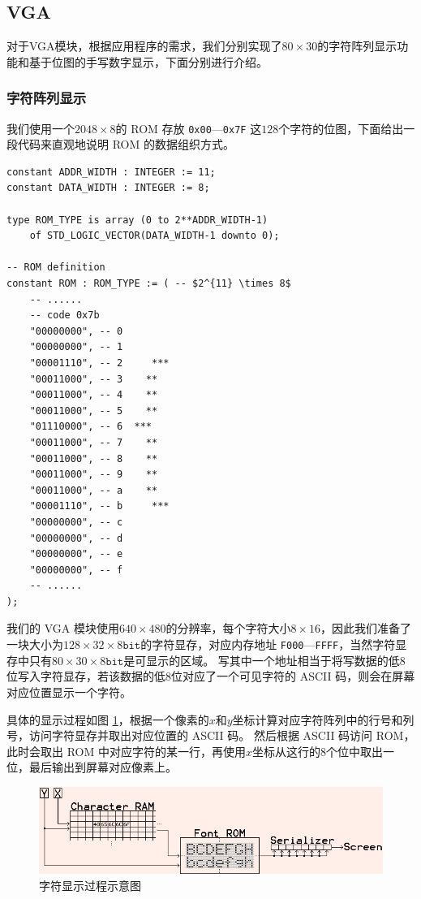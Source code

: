 \documentclass{article}
\begin{document}
\subsection{VGA}\label{sec:vga}

对于VGA模块，根据应用程序的需求，我们分别实现了$80 \times 30$的字符阵列显示功能和基于位图的手写数字显示，下面分别进行介绍。

\subsubsection{字符阵列显示}

我们使用一个$2048 \times 8$的 ROM 存放 \texttt{0x00}---\texttt{0x7F} 这$128$个字符的位图，下面给出一段代码来直观地说明 ROM 的数据组织方式。

\begin{verbatim}
constant ADDR_WIDTH : INTEGER := 11;
constant DATA_WIDTH : INTEGER := 8;

type ROM_TYPE is array (0 to 2**ADDR_WIDTH-1)
    of STD_LOGIC_VECTOR(DATA_WIDTH-1 downto 0);

-- ROM definition
constant ROM : ROM_TYPE := ( -- $2^{11} \times 8$
    -- ......
    -- code 0x7b
    "00000000", -- 0
    "00000000", -- 1
    "00001110", -- 2     ***
    "00011000", -- 3    **
    "00011000", -- 4    **
    "00011000", -- 5    **
    "01110000", -- 6  ***
    "00011000", -- 7    **
    "00011000", -- 8    **
    "00011000", -- 9    **
    "00011000", -- a    **
    "00001110", -- b     ***
    "00000000", -- c
    "00000000", -- d
    "00000000", -- e
    "00000000", -- f
    -- ......
);
\end{verbatim}

我们的 VGA 模块使用$640 \times 480$的分辨率，每个字符大小$8 \times 16$，因此我们准备了一块大小为$128 \times 32 \times 8\texttt{bit}$的字符显存，对应内存地址 \texttt{F000}---\texttt{FFFF}，当然字符显存中只有$80 \times 30 \times 8\texttt{bit}$是可显示的区域。
写其中一个地址相当于将写数据的低$8$位写入字符显存，若该数据的低$8$位对应了一个可见字符的 ASCII 码，则会在屏幕对应位置显示一个字符。

具体的显示过程如图 \ref{fig:font}，根据一个像素的$x$和$y$坐标计算对应字符阵列中的行号和列号，访问字符显存并取出对应位置的 ASCII 码。
然后根据 ASCII 码访问 ROM，此时会取出 ROM 中对应字符的某一行，再使用$x$坐标从这行的$8$个位中取出一位，最后输出到屏幕对应像素上。

\begin{figure}[ht]
\centering
\includegraphics[width=\textwidth]{figures/font.png}
\caption{字符显示过程示意图}
\label{fig:font}
\end{figure}
\end{document}
